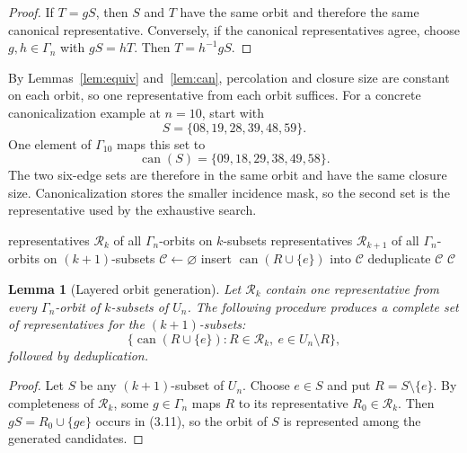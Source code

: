 \documentclass[11pt]{article}
\numberwithin{equation}{section}
\newtheorem{lemma}[theorem]{Lemma}
\begin{document}
\begin{proof}
If $T=gS$, then $S$ and $T$ have the same orbit and therefore the same
canonical representative. Conversely, if the canonical representatives
agree, choose $g,h\in\Gamma_n$ with $gS=hT$. Then
$T=h^{-1}gS$.
\end{proof}

By Lemmas~\ref{lem:equiv} and~\ref{lem:can}, percolation and closure size are
constant on each orbit, so one representative from each orbit suffices.
For a concrete canonicalization example at $n=10$, start with
\[
S=\{08,19,28,39,48,59\}.
\]
One element of $\Gamma_{10}$ maps this set to
\[
\operatorname{can}(S)=\{09,18,29,38,49,58\}.
\]
The two six-edge sets are therefore in the same orbit and have the same
closure size. Canonicalization stores the smaller incidence mask, so the
second set is the representative used by the exhaustive search.

\begin{algorithm}[t]
\caption{Complete generation of the next orbit layer}
\label{alg:orbits}
\begin{algorithmic}[1]
\Require representatives $\mathcal R_k$ of all $\Gamma_n$-orbits on $k$-subsets
\Ensure representatives $\mathcal R_{k+1}$ of all $\Gamma_n$-orbits on $(k+1)$-subsets
\State $\mathcal C\gets\varnothing$
        \State insert $\operatorname{can}(R\cup\{e\})$ into $\mathcal C$
    \EndFor
\EndFor
\State deduplicate $\mathcal C$
\State \Return $\mathcal C$
\end{algorithmic}
\end{algorithm}

\begin{lemma}[Layered orbit generation]\label{lem:layer}
Let $\mathcal R_k$ contain one representative from every $\Gamma_n$-orbit of $k$-subsets of $U_n$. The following procedure produces a complete set of representatives for the $(k+1)$-subsets:
\[
\{\operatorname{can}(R\cup\{e\}):R\in\mathcal R_k,\ e\in U_n\setminus R\},
\tag{3.11}
\]
followed by deduplication.
\end{lemma}

\begin{proof}
Let $S$ be any $(k+1)$-subset of $U_n$. Choose $e\in S$ and put $R=S\setminus\{e\}$. By completeness of $\mathcal R_k$, some $g\in\Gamma_n$ maps $R$ to its representative $R_0\in\mathcal R_k$. Then $gS=R_0\cup\{ge\}$ occurs in (3.11), so the orbit of $S$ is represented among the generated candidates.
\end{proof}
\end{document}
